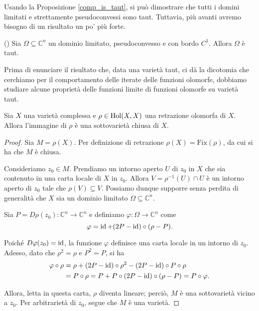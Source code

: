 Usando la Proposizione \ref{comp_is_taut}, si può dimostrare che tutti i domini limitati e strettamente pseudoconvessi sono taut. Tuttavia, più avanti avremo bisogno di un risultato un po' più forte.

\begin{prop} \label{psdcvx_is_taut}
    (\cite[Proposition 2]{KR}) Sia $\Omega\subseteq\mathbb{C}^n$ un dominio limitato, pseudoconvesso e con bordo $C^1$. Allora $\Omega$ è taut.
\end{prop}

Prima di enunciare il risultato che, data una varietà taut, ci dà la dicotomia che cerchiamo per il comportamento delle iterate delle funzioni olomorfe, dobbiamo studiare alcune proprietà delle funzioni limite di funzioni olomorfe su varietà taut.

\begin{lm}
    Sia $X$ una varietà complessa e $\rho\in\textnormal{Hol}(X,X)$ una retrazione olomorfa di $X$. Allora l'immagine di $\rho$ è una sottovarietà chiusa di $X$.
\end{lm}
\begin{proof}
    Sia $M=\rho(X)$. Per definizione di retrazione $\rho(X)=\text{Fix}(\rho)$, da cui si ha che $M$ è chiusa.
    
    Consideriamo $z_0 \in M$. Prendiamo un intorno aperto $U$ di $z_0$ in $X$ che sia contenuto in una carta locale di $X$ in $z_0$. Allora $V=\rho^{-1}(U)\cap U$ è un intorno aperto di $z_0$ tale che $\rho(V) \subseteq V$. Possiamo dunque supporre senza perdita di generalità che $X$ sia un dominio limitato $\Omega\subseteq\mathbb{C}^n$.

    Sia $P=D\rho(z_0):\mathbb{C}^n \longrightarrow \mathbb{C}^n$ e definiamo $\varphi:\Omega \longrightarrow \mathbb{C}^n$ come
    $$\varphi=\operatorname{id}+(2P-\operatorname{id})\circ(\rho-P).$$

    Poiché $D\varphi(z_0)=\operatorname{id}$, la funzione $\varphi$ definisce una carta locale in un intorno di $z_0$. Adesso, dato che $\rho^2=\rho$ e $P^2=P$, si ha
    \begin{align*}
        \varphi\circ\rho&=\rho+(2P-\operatorname{id})\circ\rho^2-(2P-\operatorname{id})\circ P\circ\rho\\
        &=P\circ\rho=P+P\circ(2P-\operatorname{id})\circ(\rho-P)=P\circ\varphi.
    \end{align*}

    Allora, letta in questa carta, $\rho$ diventa lineare; perciò, $M$ è una sottovarietà vicino a $z_0$. Per arbitrarietà di $z_0$, segue che $M$ è una varietà.
\end{proof}

